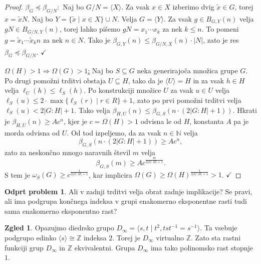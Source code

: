 \documentclass[11pt]{book}
\def\NN{\mathbb{N}}
\def\ZZ{\mathbb{Z}}
\def\kljuka{$\checkmark$}
\theoremstyle{definition}
\theoremstyle{zgled}
\newtheorem*{zgled}{Zgled}
\theoremstyle{odprtproblem}
\newtheorem*{odprtproblem}{Odprt problem}
\theoremstyle{domacanaloga}
\newenvironment{dokaz}
    {\color{siva}\begin{proof}}
    {\end{proof}}
\theoremstyle{izrek}
\begin{document}
\begin{dokaz}
\underline{$\beta_G \preceq \beta_{G/N}:$} Naj bo $G/N = \langle X \rangle$. Za vsak $x \in X$ izberimo dvig $\tilde x \in G$, torej $x = \tilde x N$. Naj bo $Y = \{ \tilde x \mid x \in X \} \cup N$. Velja $G = \langle Y \rangle$. Za vsak $g \in B_{G,Y}(n)$ velja $gN \in B_{G/N, Y}(n)$, torej lahko pišemo $gN = x_1 \cdots x_k$ za nek $k \leq n$. To pomeni $g = \tilde x_1 \cdots \tilde x_k n$ za nek $n \in N$. Tako je $\beta_{G,Y}(n) \leq \beta_{G/N,X}(n) \cdot |N|$, zato je res $\beta_G \preceq \beta_{G/N}$. \kljuka

\underline{$\Omega(H) > 1 \Rightarrow \Omega(G) > 1$:} Naj bo $S \subseteq G$ neka generirajoča množica grupe $G$. Po drugi pomožni trditvi obstaja $U \subseteq H$, tako da je $\langle U \rangle = H$ in za vsak $h \in H$ velja $\ell_U(h) \leq \ell_S(h)$. Po konstrukciji množice $U$ za vsak $u \in U$ velja $\ell_S(u) \leq 2 \cdot \max \{ \ell_S(r) \mid r \in R \} + 1$, zato po prvi pomožni trditvi velja $\ell_S(u) < 2 |G:H| + 1$. Tako velja $\beta_{H,U}(n) \leq \beta_{G,S}(n \cdot (2|G:H| + 1))$. Hkrati je $\beta_{H,U}(n) \geq A c^n$, kjer je $c = \Omega(H) > 1$ odvisna le od $H$, konstanta $A$ pa je morda odvisna od $U$. Od tod izpeljemo, da za vsak $n \in \NN$ velja
\[
\beta_{G,S}(n \cdot (2 |G:H| + 1)) \geq A c^n,
\]
zato za neskončno mnogo naravnih števil $m$ velja
\[
\beta_{G,S}(m) \geq A c^{\frac{m}{2 |G:H| + 1}}.
\]
S tem je $\omega_S(G) \geq c^{\frac{1}{2 |G:H| + 1}}$, kar implicira $\Omega(G) \geq \Omega(H)^{\frac{1}{2|G:H| + 1}} > 1$. \kljuka
\end{dokaz}

\begin{odprtproblem}
Ali v zadnji trditvi velja obrat zadnje implikacije? Se pravi, ali ima podgrupa končnega indeksa v grupi enakomerno eksponentne rasti tudi sama enakomerno eksponentno rast?
\end{odprtproblem}

\begin{zgled}
Opazujmo diedrsko grupo $D_\infty = \langle s, t \mid t^2, tst^{-1}=s^{-1} \rangle$. Ta vsebuje podgrupo edinko $\langle s \rangle \cong \ZZ$ indeksa $2$. Torej je $D_\infty$ virtualno $\ZZ$.  Zato sta rastni funkciji grup $D_\infty$ in $\ZZ$ ekvivalentni. Grupa $D_\infty$ ima tako polinomsko rast stopnje $1$.
\end{zgled}
\end{document}
